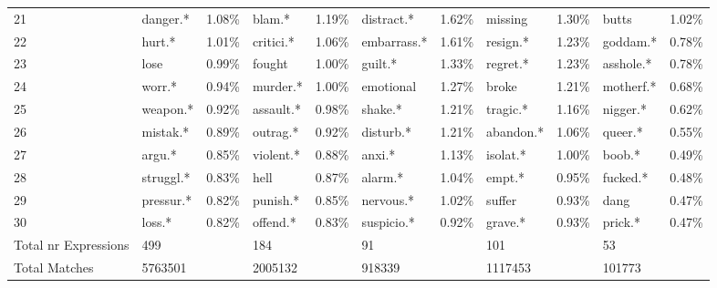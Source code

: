\begin{table}[h]
\begin{adjustbox}{width=\linewidth, center}
\begin{tabular}{lllllllllll}
	21                   &         danger.* &     1.08\% &            blam.* &           1.19\% &   distract.* &     1.62\% &       missing &     1.30\% &            butts &            1.02\% \\
	22                   &           hurt.* &     1.01\% &         critici.* &           1.06\% &  embarrass.* &     1.61\% &      resign.* &     1.23\% &         goddam.* &            0.78\% \\
	23                   &             lose &     0.99\% &            fought &           1.00\% &      guilt.* &     1.33\% &      regret.* &     1.23\% &        asshole.* &            0.78\% \\
	24                   &           worr.* &     0.94\% &          murder.* &           1.00\% &    emotional &     1.27\% &         broke &     1.21\% &        motherf.* &            0.68\% \\
	25                   &         weapon.* &     0.92\% &         assault.* &           0.98\% &      shake.* &     1.21\% &      tragic.* &     1.16\% &         nigger.* &            0.62\% \\
	26                   &         mistak.* &     0.89\% &          outrag.* &           0.92\% &    disturb.* &     1.21\% &     abandon.* &     1.06\% &          queer.* &            0.55\% \\
	27                   &           argu.* &     0.85\% &         violent.* &           0.88\% &       anxi.* &     1.13\% &      isolat.* &     1.00\% &           boob.* &            0.49\% \\
	28                   &        struggl.* &     0.83\% &              hell &           0.87\% &      alarm.* &     1.04\% &        empt.* &     0.95\% &         fucked.* &            0.48\% \\
	29                   &        pressur.* &     0.82\% &          punish.* &           0.85\% &    nervous.* &     1.02\% &        suffer &     0.93\% &             dang &            0.47\% \\
	30                   &           loss.* &     0.82\% &          offend.* &           0.83\% &   suspicio.* &     0.92\% &       grave.* &     0.93\% &          prick.* &            0.47\% \\
	Total nr Expressions &              499 &            &               184 &                  &           91 &            &           101 &            &               53 &                   \\
	Total Matches        &          5763501 &            &           2005132 &                  &       918339 &            &       1117453 &            &           101773 &                   \\
	\bottomrule
	\end{tabular}
	
\end{adjustbox}
	\end{table}

